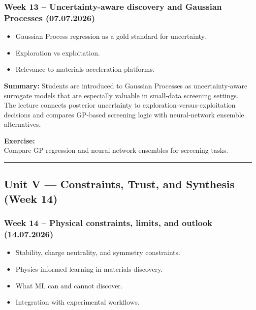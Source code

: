 \documentclass[
]{agujournal2019}
\providecommand{\tightlist}{%
  \setlength{\itemsep}{0pt}\setlength{\parskip}{0pt}}
\begin{document}
\subsubsection{Week 13 -- Uncertainty-aware discovery and Gaussian
Processes
(07.07.2026)}\label{week-13-uncertainty-aware-discovery-and-gaussian-processes-07.07.2026}

\begin{itemize}
\tightlist
\item
  Gaussian Process regression as a gold standard for uncertainty.
\item
  Exploration vs exploitation.
\item
  Relevance to materials acceleration platforms.
\end{itemize}

\textbf{Summary:} Students are introduced to Gaussian Processes as
uncertainty-aware surrogate models that are especially valuable in
small-data screening settings. The lecture connects posterior
uncertainty to exploration-versus-exploitation decisions and compares
GP-based screening logic with neural-network ensemble alternatives.

\textbf{Exercise:}\\
Compare GP regression and neural network ensembles for screening tasks.

\begin{center}\rule{0.5\linewidth}{0.5pt}\end{center}

\subsection{Unit V --- Constraints, Trust, and Synthesis (Week
14)}\label{unit-v-constraints-trust-and-synthesis-week-14}

\subsubsection{Week 14 -- Physical constraints, limits, and outlook
(14.07.2026)}\label{week-14-physical-constraints-limits-and-outlook-14.07.2026}

\begin{itemize}
\tightlist
\item
  Stability, charge neutrality, and symmetry constraints.
\item
  Physics-informed learning in materials discovery.
\item
  What ML can and cannot discover.
\item
  Integration with experimental workflows.
\end{itemize}
\end{document}
